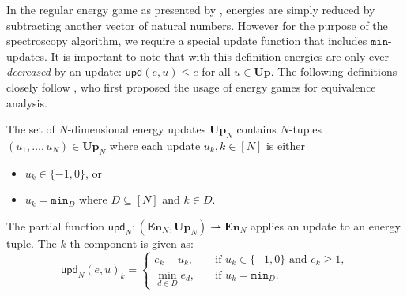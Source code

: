In the regular energy game as presented by \textcite{brihaye2023multi},
energies are simply reduced by subtracting another vector of natural numbers.
However for the purpose of the spectroscopy algorithm,
we require a special update function that includes $\mathtt{min}$-updates.
It is important to note that with this definition energies are only ever
\emph{decreased} by an update:
$\mathsf{upd}(e, u) \leq e$ for all $u \in \mathbf{Up}$.
The following definitions closely follow \textcite{bisping2023process},
who first proposed the usage of energy games for equivalence analysis.

\begin{definition}\label{def:update}
    The set of $N$-dimensional energy updates $\mathbf{Up}_N$ contains
    $N$-tuples $(u_1, \ldots, u_N) \in \mathbf{Up}_N$ where each update $u_k, k
    \in [N]$ is
    either
    \begin{itemize}
        \item $u_k \in \{-1, 0\}$, or
        \item $u_k = \mathtt{min}_D$ where $D \subseteq [N]$ and $k \in D$. %
    \end{itemize}

    The partial function
    $\mathsf{upd}_N: (\mathbf{En}_N, \mathbf{Up}_N) \rightharpoonup \mathbf{En}_N$
    applies an update to an energy tuple.
    The $k$-th component is given as:
    \begin{equation*}
        \mathsf{upd}_N{(e, u)}_k =
        \begin{cases}
            e_k + u_k,\quad &\text{if } u_k \in \{-1, 0\} \text{ and } e_k \geq 1, \\
            \min_{d \in D}{e_d},\quad &\text{if } u_k = \mathtt{min}_D. %
        \end{cases}
    \end{equation*}
\end{definition}

